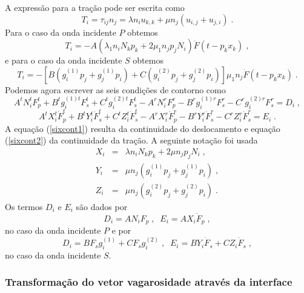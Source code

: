 A express\~ao para a tra\c{c}\~ao pode ser escrita como
\begin{equation}
T_i=\tau_{ij}n_j=\lambda n_i u_{k,k}+\mu n_j(u_{i,j}+u_{j,i}) \;.
\end{equation}
Para o caso da onda incidente $P$ obtemos
\begin{equation}
T_i=-A(\lambda_1 n_i N_kp_k+2\mu_1 n_j p_j N_i)\dot{F}(t-p_kx_k)
\;,
\end{equation}
e para o caso da onda incidente $S$ obtemos
\begin{equation}
T_i=-[B(g_i^{(1)}p_j+g_j^{(1)}p_i)+C(g_i^{(2)}p_j+g_j^{(2)}p_i)]\mu_1n_j\dot{F}(t-p_kx_k)
\;.
\end{equation}
Podemos agora escrever as seis condi\c{c}\~oes de contorno como
\begin{equation}
A^tN_i^tF_p^t+B^tg_i^{(1)t}F_s^t+C^tg_i^{(2)t}F_s^t-A^rN_i^rF_p^r-B^rg_i^{(1)r}F_s^r-C^rg_i^{(2)r}F_s^r=D_i
\;, \label{sixcont1}
\end{equation}
\begin{equation}
A^tX_i^t\dot{F}_p^t+B^tY_i^t\dot{F}_s^t+C^tZ_i^t\dot{F}_s^t-A^rX_i^r\dot{F}_p^r-B^rY_i^r\dot{F}_s^r-C^rZ_i^r\dot{F}_s^r=E_i
\;. \label{sixcont2}
\end{equation}
A equa\c{c}\~ao (\ref{sixcont1}) resulta da continuidade do
deslocamento e equa\c{c}\~ao (\ref{sixcont2}) da continuidade da
tra\c{c}\~ao. A seguinte nota\c{c}\~ao foi usada
\begin{equation}
\begin{array}{rcl}
X_i & = & \lambda n_iN_kp_k+2\mu n_jp_jN_i \;, \\
Y_i & = & \mu n_j(g_i^{(1)}p_j+g_j^{(1)}p_i) \;, \\
Z_i & = & \mu n_j(g_i^{(2)}p_j+g_j^{(2)}p_i) \;.
\end{array}
\label{XYZ}
\end{equation}
Os termos $D_i$ e $E_i$ s\~ao dados por
\begin{equation}
D_i=AN_iF_p \;, \;\; E_i=AX_i\dot{F}_p \;,
\end{equation}
no caso da onda incidente $P$ e por
\begin{equation}
D_i=BF_sg_i^{(1)}+CF_sg_i^{(2)} \;, \;\;
E_i=BY_i\dot{F}_s+CZ_i\dot{F}_s \;,
\end{equation}
no caso da onda incidente $S$.

\subsubsection{Transforma\c{c}\~ao do vetor vagarosidade atrav\'es da interface}


